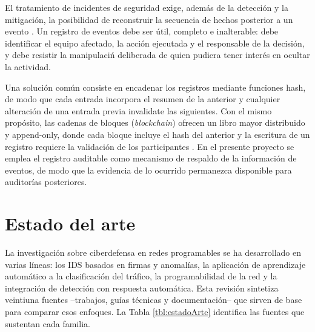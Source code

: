 El tratamiento de incidentes de seguridad exige, adem\'as de la detecci\'on y la mitigaci\'on, la posibilidad de reconstruir la secuencia de hechos posterior a un evento \parencite{nist80061r2}. Un registro de eventos debe ser \'util, completo e inalterable: debe identificar el equipo afectado, la acci\'on ejecutada y el responsable de la decisi\'on, y debe resistir la manipulaci\'n deliberada de quien pudiera tener interés en ocultar la actividad.

Una soluci\'on com\'un consiste en encadenar los registros mediante funciones hash, de modo que cada entrada incorpora el resumen de la anterior y cualquier alteraci\'on de una entrada previa invalidate las siguientes. Con el mismo prop\'osito, las cadenas de bloques (\emph{blockchain}) ofrecen un libro mayor distribuido y append-only, donde cada bloque incluye el hash del anterior y la escritura de un registro requiere la validaci\'on de los participantes \parencite{nakamoto2008}. En el presente proyecto se emplea el registro auditable como mecanismo de respaldo de la informaci\'on de eventos, de modo que la evidencia de lo ocurrido permanezca disponible para auditor\'ias posteriores.

\section{Estado del arte}
\label{sec:estadoArte}

La investigaci\'on sobre ciberdefensa en redes programables se ha desarrollado en varias l\'ineas: los IDS basados en firmas y anomal\'ias, la aplicaci\'on de aprendizaje autom\'atico a la clasificaci\'on del tr\'afico, la programabilidad de la red y la integraci\'on de detecci\'on con respuesta autom\'atica. Esta revisi\'on sintetiza veintiuna fuentes --trabajos, gu\'ias t\'ecnicas y documentaci\'on-- que sirven de base para comparar esos enfoques. La Tabla \ref{tbl:estadoArte} identifica las fuentes que sustentan cada familia.

